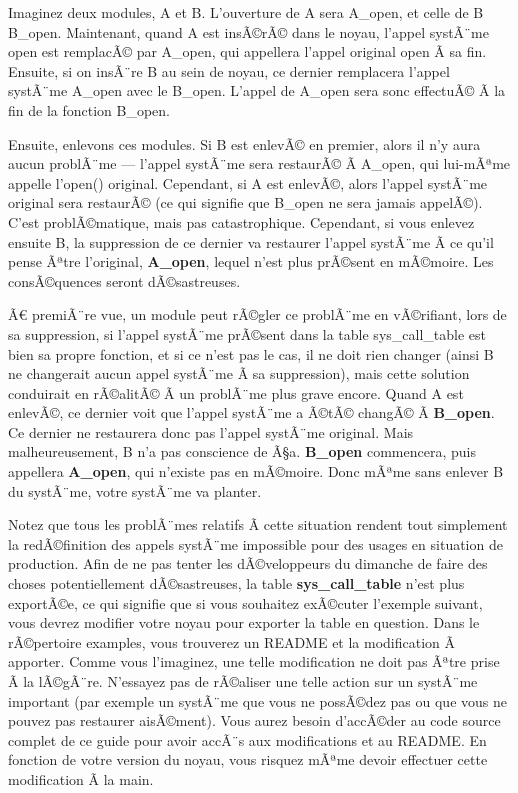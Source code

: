 \documentclass[11pt]{article}
\begin{document}
Imaginez deux modules, A et B. L'ouverture de A sera A\_open, et celle de B B\_open. Maintenant, quand A est insÃ©rÃ© dans le noyau, l'appel systÃ¨me open est remplacÃ© par A\_open, qui appellera l'appel original open Ã  sa fin. Ensuite, si on insÃ¨re B au sein de noyau, ce dernier remplacera l'appel systÃ¨me A\_open avec le B\_open. L'appel de A\_open sera sonc effectuÃ© Ã  la fin de la fonction B\_open.

Ensuite, enlevons ces modules. Si B est enlevÃ© en premier, alors il n'y aura aucun problÃ¨me --- l'appel systÃ¨me sera restaurÃ© Ã  A\_open, qui lui-mÃªme appelle l'open() original. Cependant, si A est enlevÃ©, alors l'appel systÃ¨me original sera restaurÃ© (ce qui signifie que B\_open ne sera jamais appelÃ©). C'est problÃ©matique, mais pas catastrophique. Cependant, si vous enlevez ensuite B, la suppression de ce dernier va restaurer l'appel systÃ¨me Ã  ce qu'il pense Ãªtre l'original, \textbf{A\_open}, lequel n'est plus prÃ©sent en mÃ©moire. Les consÃ©quences seront dÃ©sastreuses.

Ã€ premiÃ¨re vue, un module peut rÃ©gler ce problÃ¨me en vÃ©rifiant, lors de sa suppression, si l'appel systÃ¨me prÃ©sent dans la table sys\_call\_table est bien sa propre fonction, et si ce n'est pas le cas, il ne doit rien changer (ainsi B ne changerait aucun appel systÃ¨me Ã  sa suppression), mais cette solution conduirait en rÃ©alitÃ© Ã  un problÃ¨me plus grave encore. Quand A est enlevÃ©, ce dernier voit que l'appel systÃ¨me a Ã©tÃ© changÃ© Ã  \textbf{B\_open}. Ce dernier ne restaurera donc pas l'appel systÃ¨me original. Mais malheureusement, B n'a pas conscience de Ã§a. \textbf{B\_open} commencera, puis appellera \textbf{A\_open}, qui n'existe pas en mÃ©moire. Donc mÃªme sans enlever B du systÃ¨me, votre systÃ¨me va planter.

Notez que tous les problÃ¨mes relatifs Ã  cette situation rendent tout simplement la redÃ©finition des appels systÃ¨me impossible pour des usages en situation de production. Afin de ne pas tenter les dÃ©veloppeurs du dimanche de faire des choses potentiellement dÃ©sastreuses, la table \textbf{sys\_call\_table} n'est plus exportÃ©e, ce qui signifie que si vous souhaitez exÃ©cuter l'exemple suivant, vous devrez modifier votre noyau pour exporter la table en question. Dans le rÃ©pertoire examples, vous trouverez un README et la modification Ã  apporter. Comme vous l'imaginez, une telle modification ne doit pas Ãªtre prise Ã  la lÃ©gÃ¨re. N'essayez pas de rÃ©aliser une telle action sur un systÃ¨me important (par exemple un systÃ¨me que vous ne possÃ©dez pas ou que vous ne pouvez pas restaurer aisÃ©ment). Vous aurez besoin d'accÃ©der au code source complet de ce guide pour avoir accÃ¨s aux modifications et au README. En fonction de votre version du noyau, vous risquez mÃªme devoir effectuer cette modification Ã  la main.
\end{document}
